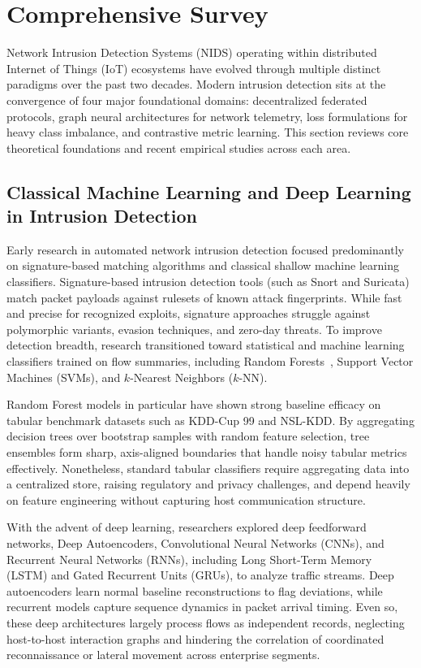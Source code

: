 \documentclass[12pt,a4paper]{report}
\begin{document}
\section{Comprehensive Survey}\label{sec:comprehensive_survey}
\label{sec:survey}

Network Intrusion Detection Systems (NIDS) operating within distributed Internet of Things (IoT) ecosystems have evolved through multiple distinct paradigms over the past two decades. Modern intrusion detection sits at the convergence of four major foundational domains: decentralized federated protocols, graph neural architectures for network telemetry, loss formulations for heavy class imbalance, and contrastive metric learning. This section reviews core theoretical foundations and recent empirical studies across each area.

\subsection{Classical Machine Learning and Deep Learning in Intrusion Detection}
Early research in automated network intrusion detection focused predominantly on signature-based matching algorithms and classical shallow machine learning classifiers. Signature-based intrusion detection tools (such as Snort and Suricata) match packet payloads against rulesets of known attack fingerprints. While fast and precise for recognized exploits, signature approaches struggle against polymorphic variants, evasion techniques, and zero-day threats. To improve detection breadth, research transitioned toward statistical and machine learning classifiers trained on flow summaries, including Random Forests~\cite{breiman2001randomforests}, Support Vector Machines (SVMs), and $k$-Nearest Neighbors ($k$-NN).

Random Forest models in particular have shown strong baseline efficacy on tabular benchmark datasets such as KDD-Cup 99 and NSL-KDD. By aggregating decision trees over bootstrap samples with random feature selection, tree ensembles form sharp, axis-aligned boundaries that handle noisy tabular metrics effectively. Nonetheless, standard tabular classifiers require aggregating data into a centralized store, raising regulatory and privacy challenges, and depend heavily on feature engineering without capturing host communication structure.

With the advent of deep learning, researchers explored deep feedforward networks, Deep Autoencoders, Convolutional Neural Networks (CNNs), and Recurrent Neural Networks (RNNs), including Long Short-Term Memory (LSTM) and Gated Recurrent Units (GRUs), to analyze traffic streams. Deep autoencoders learn normal baseline reconstructions to flag deviations, while recurrent models capture sequence dynamics in packet arrival timing. Even so, these deep architectures largely process flows as independent records, neglecting host-to-host interaction graphs and hindering the correlation of coordinated reconnaissance or lateral movement across enterprise segments.
\end{document}
